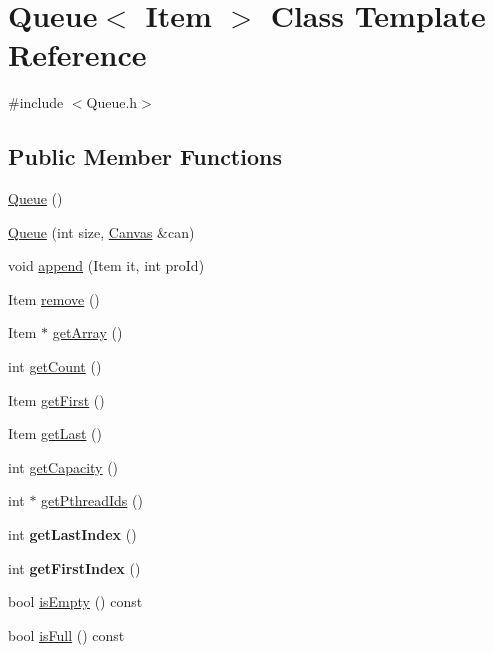 \hypertarget{class_queue}{}\section{Queue$<$ Item $>$ Class Template Reference}
\label{class_queue}


{\ttfamily \#include $<$Queue.\+h$>$}

\subsection*{Public Member Functions}
\begin{DoxyCompactItemize}
\item 
\hyperlink{class_queue_a142ee0cc45f8650ef4c5bb7623a1147c}{Queue} ()
\item 
\hyperlink{class_queue_ab79f488d66116888a8879756f7116ffc}{Queue} (int size, \hyperlink{classtsgl_1_1_canvas}{Canvas} \&can)
\item 
void \hyperlink{class_queue_af529bb8ea595f04a4e001235d9fa9500}{append} (Item it, int pro\+Id)
\item 
Item \hyperlink{class_queue_a5ebe3e112ee1abf233f113ed41e4df29}{remove} ()
\item 
Item $\ast$ \hyperlink{class_queue_ab1da66d1953215740872a16e8209b105}{get\+Array} ()
\item 
int \hyperlink{class_queue_af7cc83c36b93e41575dbe938d4ef3f2b}{get\+Count} ()
\item 
Item \hyperlink{class_queue_a15c3329a7420cae121756c940cee2dbd}{get\+First} ()
\item 
Item \hyperlink{class_queue_ae4235161a26b4452f7c56fcfff3866d2}{get\+Last} ()
\item 
int \hyperlink{class_queue_ae347bb155f5513bc330b354aeec625f8}{get\+Capacity} ()
\item 
int $\ast$ \hyperlink{class_queue_a3b4fdca4e9907c895f77557a9c928524}{get\+Pthread\+Ids} ()
\item 
\mbox{\label{class_queue_a2259d7acdc255b254b4b988d67eb8864}} 
int {\bfseries get\+Last\+Index} ()
\item 
\mbox{\label{class_queue_a86a52a4831e7c8cab4ef26be9afac318}} 
int {\bfseries get\+First\+Index} ()
\item 
bool \hyperlink{class_queue_a8ce4be8838aeb2a8dd68f3bd96e78c94}{is\+Empty} () const
\item 
bool \hyperlink{class_queue_a6d5941cebd6fe01ceefbe7138ff7f048}{is\+Full} () const

\end{DoxyCompactItemize}
